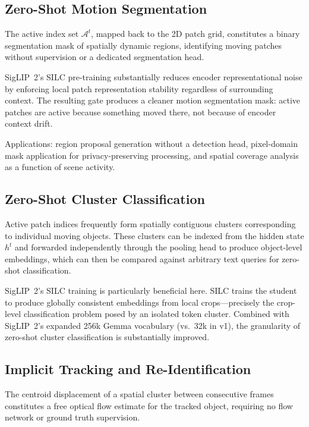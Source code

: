 \documentclass{article}
\begin{document}
\subsection{Zero-Shot Motion Segmentation}
\label{sec:emergent-segmentation}

The active index set $\mathcal{A}^t$, mapped back to the 2D patch grid,
constitutes a binary segmentation mask of spatially dynamic regions,
identifying moving patches without supervision or a dedicated segmentation
head.

SigLIP~2's SILC pre-training substantially reduces encoder representational
noise by enforcing local patch representation stability regardless of
surrounding context. The resulting gate produces a cleaner motion
segmentation mask: active patches are active because something moved
there, not because of encoder context drift.

Applications: region proposal generation without a detection head,
pixel-domain mask application for privacy-preserving processing, and
spatial coverage analysis as a function of scene activity.

\subsection{Zero-Shot Cluster Classification}
\label{sec:emergent-cluster}

Active patch indices frequently form spatially contiguous clusters
corresponding to individual moving objects. These clusters can be
indexed from the hidden state $h^t$ and forwarded independently through
the pooling head to produce object-level embeddings, which can then be
compared against arbitrary text queries for zero-shot classification.

SigLIP~2's SILC training is particularly beneficial here. SILC trains
the student to produce globally consistent embeddings from local
crops---precisely the crop-level classification problem posed by an
isolated token cluster. Combined with SigLIP~2's expanded 256k Gemma
vocabulary (vs.\ 32k in v1), the granularity of zero-shot cluster
classification is substantially improved.

\subsection{Implicit Tracking and Re-Identification}
\label{sec:emergent-tracking}

The centroid displacement of a spatial cluster between consecutive frames
constitutes a free optical flow estimate for the tracked object, requiring
no flow network or ground truth supervision.
\end{document}
